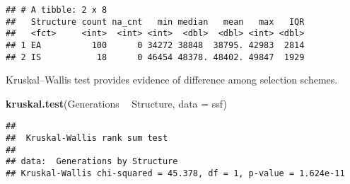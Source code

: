 \documentclass[]{book}
\newenvironment{Shaded}{\begin{snugshade}}{\end{snugshade}}
\newcommand{\CharTok}[1]{\textcolor[rgb]{0.31,0.60,0.02}{#1}}
\newcommand{\DataTypeTok}[1]{\textcolor[rgb]{0.13,0.29,0.53}{#1}}
\newcommand{\DecValTok}[1]{\textcolor[rgb]{0.00,0.00,0.81}{#1}}
\newcommand{\KeywordTok}[1]{\textcolor[rgb]{0.13,0.29,0.53}{\textbf{#1}}}
\newcommand{\NormalTok}[1]{#1}
\newcommand{\OperatorTok}[1]{\textcolor[rgb]{0.81,0.36,0.00}{\textbf{#1}}}
\newcommand{\OtherTok}[1]{\textcolor[rgb]{0.56,0.35,0.01}{#1}}
\newcommand{\StringTok}[1]{\textcolor[rgb]{0.31,0.60,0.02}{#1}}
\begin{document}
\begin{Shaded}
\end{Shaded}

\begin{verbatim}
## # A tibble: 2 x 8
##   Structure count na_cnt   min median   mean   max   IQR
##   <fct>     <int>  <int> <int>  <dbl>  <dbl> <int> <dbl>
## 1 EA          100      0 34272 38848  38795. 42983  2814
## 2 IS           18      0 46454 48378. 48402. 49847  1929
\end{verbatim}

Kruskal--Wallis test provides evidence of difference among selection schemes.

\begin{Shaded}
\begin{Highlighting}[]
\KeywordTok{kruskal.test}\NormalTok{(Generations }\OperatorTok{~}\StringTok{ }\NormalTok{Structure, }\DataTypeTok{data =}\NormalTok{ ssf)}
\end{Highlighting}
\end{Shaded}

\begin{verbatim}
## 
##  Kruskal-Wallis rank sum test
## 
## data:  Generations by Structure
## Kruskal-Wallis chi-squared = 45.378, df = 1, p-value = 1.624e-11
\end{verbatim}
\end{document}

